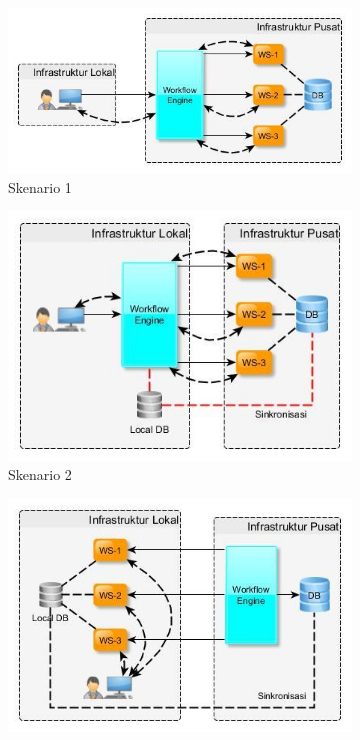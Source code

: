 \begin{figure}[H]
    \begin{subfigure}{.5\textwidth}
  		\centering
  		\includegraphics[width=.8\linewidth]{images/design-1}
  		\caption{Skenario 1}
  		\label{fig:design-workflow-webservice-1}
	\end{subfigure}%
	\begin{subfigure}{.5\textwidth}
  		\centering
  		\includegraphics[width=.8\linewidth]{images/design-2}
  		\caption{Skenario 2}
  		\label{fig:design-workflow-webservice-2}
	\end{subfigure}
	\begin{subfigure}{.5\textwidth}
  		\centering
  		\includegraphics[width=.8\linewidth]{images/design-3}

\end{subfigure}
\end{figure}
